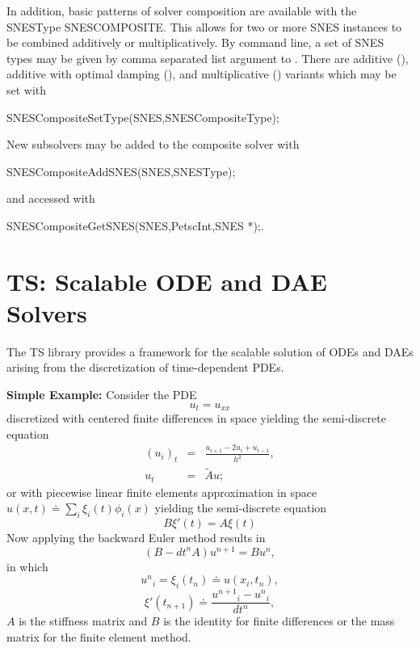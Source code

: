 In addition, basic patterns of solver composition are available with the SNESType SNESCOMPOSITE.  This allows for two or
more SNES instances to be combined additively or multiplicatively.  By command line, a set of SNES types may be given by
comma separated list argument to .  There are additive (),
additive with optimal damping (), and multiplicative
() variants which may be set with
\begin{tabbing}
SNESCompositeSetType(SNES,SNESCompositeType);
\end{tabbing}
New subsolvers may be added to the composite solver with
\begin{tabbing}
SNESCompositeAddSNES(SNES,SNESType);
\end{tabbing}
and accessed with
\begin{tabbing}
SNESCompositeGetSNES(SNES,PetscInt,SNES *);.
\end{tabbing}

\cleardoublepage
\chapter{TS: Scalable ODE and DAE Solvers}
\label{chapter_ts}

The TS library provides a framework for the scalable solution of ODEs and DAEs
arising from the discretization of time-dependent PDEs.

\vspace{.2cm}

\noindent

{\bf Simple Example:} Consider the PDE
\[
          u_t = u_{xx}
\]
discretized with centered finite differences in space yielding  the  semi-discrete equation
\begin{eqnarray*}
          (u_i)_t & =  & \frac{u_{i+1} - 2 u_{i} + u_{i-1}}{h^2}, \\
           u_t      &  = & \tilde{A} u;
\end{eqnarray*}
or with piecewise linear finite elements approximation in space
$ u(x,t) \doteq \sum_i \xi_i(t) \phi_i(x)$ yielding the  semi-discrete equation
\[
          B {\xi}'(t) = A \xi(t)
\]
Now applying the backward Euler method results in
\[
        ( B - dt^n A  ) u^{n+1} = B u^n,
\]
in which
\[
         {u^n}_i = \xi_i(t_n) \doteq u(x_i,t_n),
\]
\[
         {\xi}'(t_{n+1}) \doteq \frac{{u^{n+1}}_i - {u^{n}}_i }{dt^{n}},
\]
$A$ is the stiffness matrix and $B$ is the identity for finite differences or the mass matrix for the finite element method.

